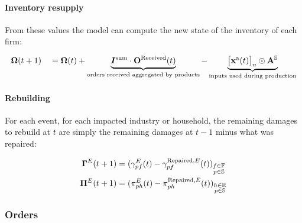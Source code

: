 \documentclass[main.tex]{subfiles}
\begin{document}


\paragraph{Inventory resupply}
\label{sec:inventory-resupply}


From these values the model can compute the new state of the inventory of each
firm:

\begin{alignat*}{4}
  &\mathbf{\Omega}(t+1) &&= \mathbf{\Omega}(t) + \underbrace{ \bm{I}^{\textrm{sum}} \cdot
                  \mathbf{O}^{\textrm{Received}}(t) }_{\text{orders received
                  aggregated by products}} - \underbrace{\begin{bmatrix} \mathbf{x}^{\textrm{a}}(t) \end{bmatrix}_{n} \odot \mathbf{A}^{\mathbb{S}}}_{\text{inputs used during production}}\\
\end{alignat*}

\paragraph{Rebuilding}
\label{sec:rebuilding}


For each event, for each impacted industry or household, the remaining damages
to rebuild at $t$ are simply the remaining damages at $t-1$ minus what was repaired:

\begin{align*}
  \mathbf{\Gamma}^{E}(t+1) &= (\gamma^{E}_{pf}(t) - \gamma^{\textrm{Repaired},E}_{pf}(t) )_{\substack{f \in \mathbb{F}\\p \in \mathbb{S}}}\\
  \bm{\Pi}^{E}(t+1) &= (\pi^{E}_{ph}(t) - \pi^{\textrm{Repaired},E}_{ph}(t))_{\substack{h \in \mathbb{R}\\p \in \mathbb{S}}}\\
\end{align*}

\subsubsection{Orders}
\label{par:orders_sh}
\end{document}
